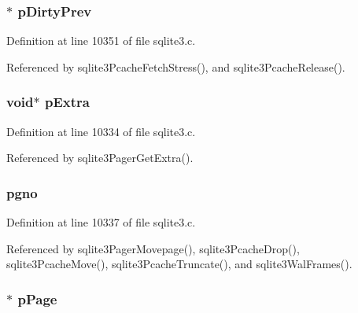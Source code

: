 \hypertarget{struct_pg_hdr_a0292a09b055dcf8f39e438751dd5e433}{}
\subsubsection[{p\+Dirty\+Prev}]{$\ast$ p\+Dirty\+Prev}\label{struct_pg_hdr_a0292a09b055dcf8f39e438751dd5e433}


Definition at line 10351 of file sqlite3.\+c.



Referenced by sqlite3\+Pcache\+Fetch\+Stress(), and sqlite3\+Pcache\+Release().

\hypertarget{struct_pg_hdr_a484f2fe7f225c408158584262bebab66}{}
\subsubsection[{p\+Extra}]{\setlength{\rightskip}{0pt plus 5cm}void$\ast$ p\+Extra}\label{struct_pg_hdr_a484f2fe7f225c408158584262bebab66}


Definition at line 10334 of file sqlite3.\+c.



Referenced by sqlite3\+Pager\+Get\+Extra().

\hypertarget{struct_pg_hdr_a77cf3333a46c0b2e6d1614dce1a6405a}{}
\subsubsection[{pgno}]{ pgno}\label{struct_pg_hdr_a77cf3333a46c0b2e6d1614dce1a6405a}


Definition at line 10337 of file sqlite3.\+c.



Referenced by sqlite3\+Pager\+Movepage(), sqlite3\+Pcache\+Drop(), sqlite3\+Pcache\+Move(), sqlite3\+Pcache\+Truncate(), and sqlite3\+Wal\+Frames().

\hypertarget{struct_pg_hdr_a93dd9756d090be6aaeae1d086dbad7d9}{}
\subsubsection[{p\+Page}]{$\ast$ p\+Page}\label{struct_pg_hdr_a93dd9756d090be6aaeae1d086dbad7d9}


